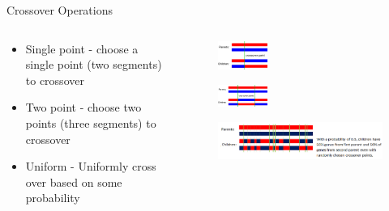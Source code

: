 \documentclass[compress]{beamer}
\begin{document}
\begin{frame}{Crossover Operations}
	\begin{columns}[onlytextwidth]
	\begin{column}{0.4\textwidth}
  \begin{itemize}
    \item Single point - choose a single point (two segments) to crossover
    \item Two point - choose two points (three segments) to crossover
    \item Uniform - Uniformly cross over based on some probability
  \end{itemize}
	\end{column}
	\begin{column}{0.55\textwidth}
    \begin{figure}
      \centering
      \includegraphics[width=0.3\textwidth]{SinglePointCrossover.png}
    \end{figure}
    \begin{figure}
      \centering
      \includegraphics[width=0.3\textwidth]{TwoPointCrossover.png}
    \end{figure}
    \begin{figure}
      \centering
      \includegraphics[width=\textwidth]{UniformCrossover.png}
    \end{figure}
	\end{column}
	\end{columns}
\end{frame}
\end{document}
